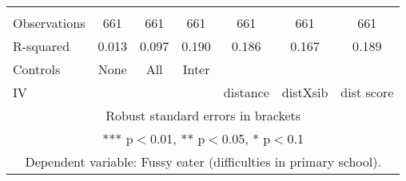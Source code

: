 \begin{tabular}{lcccccc}
 &  &  &  &  &  &  \\
Observations & 661 & 661 & 661 & 661 & 661 & 661 \\
R-squared & 0.013 & 0.097 & 0.190 & 0.186 & 0.167 & 0.189 \\
Controls & None & All & Inter &  &  &  \\
 IV &  &  &  & distance & distXsib & dist score \\ \hline
\multicolumn{7}{c}{ Robust standard errors in brackets} \\
\multicolumn{7}{c}{ *** p$<$0.01, ** p$<$0.05, * p$<$0.1} \\
\multicolumn{7}{c}{ Dependent variable: Fussy eater (difficulties in primary school).} \\
\end{tabular}

